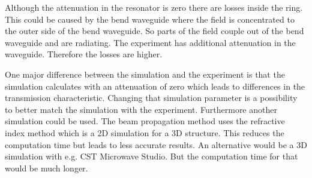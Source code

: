 Although the attenuation in the resonator is zero there are losses inside the ring. This could be caused by the bend waveguide where the field is concentrated to the outer side of the bend waveguide. So parts of the field couple out of the bend waveguide and are radiating.
The experiment has additional attenuation in the waveguide. Therefore the losses are higher.


One major difference between the simulation and the experiment is that the simulation calculates with an attenuation of zero which leads to differences in the transmission characteristic. Changing that simulation parameter is a possibility to better match the simulation with the experiment. 
Furthermore another simulation could be used. The beam propagation method uses the refractive index method which is a 2D simulation for a 3D structure. This reduces the computation time but leads to less accurate results. An alternative would be a 3D simulation with e.g. CST Microwave Studio. But the computation time for that would be much longer. 
